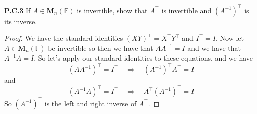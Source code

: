 \documentclass[12pt]{amsart}
\begin{document}
\begin{onehalfspace}
        \noindent\textbf{P.C.3} If $A\in\mathbf{M}_n(\mathbb{F})$ is invertible, show that
        $A^\top$ is invertible and $(A^{-1})^\top$ is its inverse.
        \begin{proof}
            We have the standard identities $(XY)^\top =X^\top Y^\top$ and $I^\top = I$. Now
            let $A\in\mathbf{M}_n(\mathbb{F})$ be invertible so then we have that $AA^{-1}=I$ and
            we have that $A^{-1}A=I$. So let's apply our standard identities to these equations, and we have
            \begin{displaymath}
                (AA^{-1})^{\top} = I^{\top} \quad\Rightarrow\quad (A^{-1})^\top A^\top = I
            \end{displaymath}
            and
            \begin{displaymath}
                (A^{-1}A)^{\top} = I^{\top} \quad\Rightarrow\quad A^{\top}(A^{-1})^{\top} = I
            \end{displaymath}
            So $(A^{-1})^\top$ is the left and right inverse of $A^\top$.
        \end{proof}


\end{onehalfspace}
\end{document}
